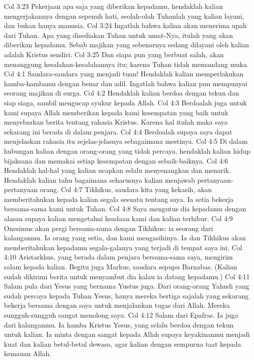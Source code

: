 Col 3:23  Pekerjaan apa saja yang diberikan kepadamu, hendaklah kalian mengerjakannya dengan sepenuh hati, seolah-olah Tuhanlah yang kalian layani, dan bukan hanya manusia.
Col 3:24  Ingatlah bahwa kalian akan menerima upah dari Tuhan. Apa yang disediakan Tuhan untuk umat-Nya, itulah yang akan diberikan kepadamu. Sebab majikan yang sebenarnya sedang dilayani oleh kalian adalah Kristus sendiri.
Col 3:25  Dan siapa pun yang berbuat salah, akan menanggung kesalahan-kesalahannya itu; karena Tuhan tidak memandang muka.
Col 4:1  Saudara-saudara yang menjadi tuan! Hendaklah kalian memperlakukan hamba-hambamu dengan benar dan adil. Ingatlah bahwa kalian pun mempunyai seorang majikan di surga.
Col 4:2  Hendaklah kalian berdoa dengan tekun dan siap siaga, sambil mengucap syukur kepada Allah.
Col 4:3  Berdoalah juga untuk kami supaya Allah memberikan kepada kami kesempatan yang baik untuk menyebarkan berita tentang rahasia Kristus. Karena hal itulah maka saya sekarang ini berada di dalam penjara.
Col 4:4  Berdoalah supaya saya dapat menjelaskan rahasia itu sejelas-jelasnya sebagaimana mestinya.
Col 4:5  Di dalam hubungan kalian dengan orang-orang yang tidak percaya, hendaklah kalian hidup bijaksana dan memakai setiap kesempatan dengan sebaik-baiknya.
Col 4:6  Hendaklah hal-hal yang kalian ucapkan selalu menyenangkan dan menarik. Hendaklah kalian tahu bagaimana seharusnya kalian menjawab pertanyaan-pertanyaan orang.
Col 4:7  Tikhikus, saudara kita yang kekasih, akan memberitahukan kepada kalian segala sesuatu tentang saya. Ia setia bekerja bersama-sama kami untuk Tuhan.
Col 4:8  Saya mengutus dia kepadamu dengan alasan supaya kalian mengetahui keadaan kami dan kalian terhibur.
Col 4:9  Onesimus akan pergi bersama-sama dengan Tikhikus; ia seorang dari kalanganmu. Ia orang yang setia, dan kami mengasihinya. Ia dan Tikhikus akan memberitahukan kepadamu segala-galanya yang terjadi di tempat saya ini.
Col 4:10  Aristarkhus, yang berada dalam penjara bersama-sama saya, mengirim salam kepada kalian. Begitu juga Markus, saudara sepupu Barnabas. (Kalian sudah dikirimi berita untuk menyambut dia kalau ia datang kepadamu.)
Col 4:11  Salam pula dari Yesus yang bernama Yustus juga. Dari orang-orang Yahudi yang sudah percaya kepada Tuhan Yesus, hanya mereka bertiga sajalah yang sekarang bekerja bersama dengan saya untuk menjalankan tugas dari Allah. Mereka sungguh-sungguh sangat menolong saya.
Col 4:12  Salam dari Epafras. Ia juga dari kalanganmu. Ia hamba Kristus Yesus, yang selalu berdoa dengan tekun untuk kalian. Ia minta dengan sangat kepada Allah supaya keyakinanmu menjadi kuat dan kalian betul-betul dewasa, agar kalian dengan sempurna taat kepada kemauan Allah.
